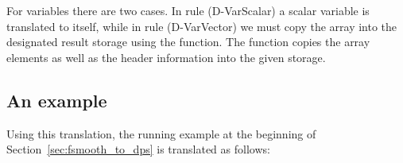 For variables there are two cases. In rule (D-VarScalar) a scalar variable is translated to itself, while in rule (D-VarVector) we must copy the array into the designated result storage
using the  function. The  function copies the array elements as well as the header information into the given storage. %




\subsection{An example}

Using this translation, the running example at the beginning of Section~\ref{sec:fsmooth_to_dps}
is translated as follows:

